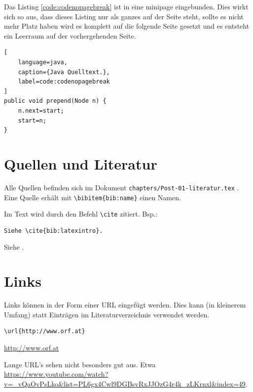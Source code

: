 Das Listing \ref{code:codenopagebreak} ist in eine minipage eingebunden.
Dies wirkt sich so aus, dass dieses Listing nur als ganzes auf der Seite steht, sollte es nicht mehr Platz haben wird es komplett auf die folgende Seite gesetzt und es entsteht ein Leerraum auf der vorhergehenden Seite.

\begin{minipage}{\linewidth}
\begin{lstlisting}[
	language=java,
	caption={Java Quelltext.},
	label=code:codenopagebreak
]
public void prepend(Node n) {
	n.next=start;
	start=n;
}
\end{lstlisting}
\end{minipage}


\section{Quellen und Literatur}

Alle Quellen befinden sich im Dokument \verb+chapters/Post-01-literatur.tex+ .
Eine Quelle erhält mit \lstinline|\bibitem{bib:name}| einen Namen.

Im Text wird durch den Befehl \lstinline{\cite} zitiert.
Bsp.:

\begin{Verbatim}[frame=single]
Siehe \cite{bib:latexintro}.
\end{Verbatim}

\begin{framed}
Siehe \cite{bib:latexintro}.
\end{framed}



\section{Links}

Links können in der Form einer URL eingefügt werden.
Dies kann (in kleinerem Umfang) statt Einträgen im Literaturverzeichnis verwendet werden.

\begin{Verbatim}[frame=single]
\url{http://www.orf.at}
\end{Verbatim}
\begin{framed}
\url{http://www.orf.at}
\end{framed}

Lange URL's sehen nicht besonders gut aus. Etwa \url{https://www.youtube.com/watch?v=_vQaOvPsLko&list=PL6gx4Cwl9DGBsvRxJJOzG4r4k_zLKrnxl&index=49}.

